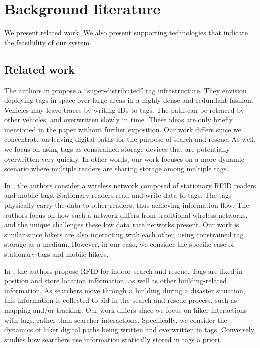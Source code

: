 \documentclass[conference]{IEEEtran}
\begin{document}
\section{Background literature}
\label{sec:background}
We present related work.  We also present supporting technologies that indicate the feasibility of our system.

\subsection{Related work}
The authors in \cite{bookseries:bohn01} propose a ``super-distributed'' tag infrastructure.  They envision deploying tags in space over large areas in a highly dense and redundant fashion.  Vehicles may leave traces by writing IDs to tags.  The path can be retraced by other vehicles, and overwritten slowly in time.  These ideas are only briefly mentioned in the paper without further exposition.  Our work differs since we concentrate on leaving digital paths for the purpose of search and rescue.  As well, we focus on using tags as constrained storage devices that are potentially overwritten very quickly.  In other words, our work focuses on a more dynamic scenario where multiple readers are sharing storage among multiple tags.

In \cite{2009finders}, the authors consider a wireless network composed of stationary RFID readers and mobile tags.  Stationary readers read and write data to tags.  The tags physically carry the data to other readers, thus achieving information flow.  The authors focus on how such a network differs from traditional wireless networks, and the unique challenges these low data rate networks present.  Our work is similar since hikers are also interacting with each other, using constrained tag storage as a medium.  However, in our case, we consider the specific case of stationary tags and mobile hikers.

In \cite{2006miller}, the authors propose RFID for indoor search and rescue.  Tags are fixed in position and store location information, as well as other building-related information.  As searchers move through a building during a disaster situation, this information is collected to aid in the search and rescue process, such as mapping and/or tracking.  Our work differs since we focus on hiker interactions with tags, rather than searcher interactions.  Specifically, we consider the dynamics of hiker digital paths being written and overwritten in tags.  Conversely, \cite{2006miller} studies how searchers use information statically stored in tags a priori.
\end{document}
